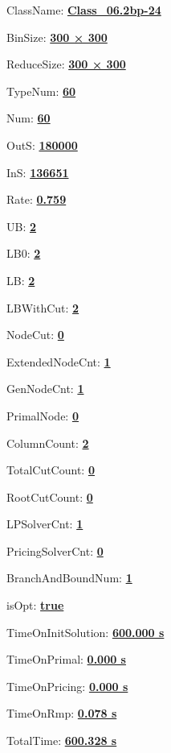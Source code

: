 \documentclass[11pt]{article}
\begin{document}
\pagestyle{empty}


ClassName: \underline{\textbf{Class_06.2bp-24}}
\par
BinSize: \underline{\textbf{300 × 300}}
\par
ReduceSize: \underline{\textbf{300 × 300}}
\par
TypeNum: \underline{\textbf{60}}
\par
Num: \underline{\textbf{60}}
\par
OutS: \underline{\textbf{180000}}
\par
InS: \underline{\textbf{136651}}
\par
Rate: \underline{\textbf{0.759}}
\par
UB: \underline{\textbf{2}}
\par
LB0: \underline{\textbf{2}}
\par
LB: \underline{\textbf{2}}
\par
LBWithCut: \underline{\textbf{2}}
\par
NodeCut: \underline{\textbf{0}}
\par
ExtendedNodeCnt: \underline{\textbf{1}}
\par
GenNodeCnt: \underline{\textbf{1}}
\par
PrimalNode: \underline{\textbf{0}}
\par
ColumnCount: \underline{\textbf{2}}
\par
TotalCutCount: \underline{\textbf{0}}
\par
RootCutCount: \underline{\textbf{0}}
\par
LPSolverCnt: \underline{\textbf{1}}
\par
PricingSolverCnt: \underline{\textbf{0}}
\par
BranchAndBoundNum: \underline{\textbf{1}}
\par
isOpt: \underline{\textbf{true}}
\par
TimeOnInitSolution: \underline{\textbf{600.000 s}}
\par
TimeOnPrimal: \underline{\textbf{0.000 s}}
\par
TimeOnPricing: \underline{\textbf{0.000 s}}
\par
TimeOnRmp: \underline{\textbf{0.078 s}}
\par
TotalTime: \underline{\textbf{600.328 s}}
\par
\newpage
\end{document}

